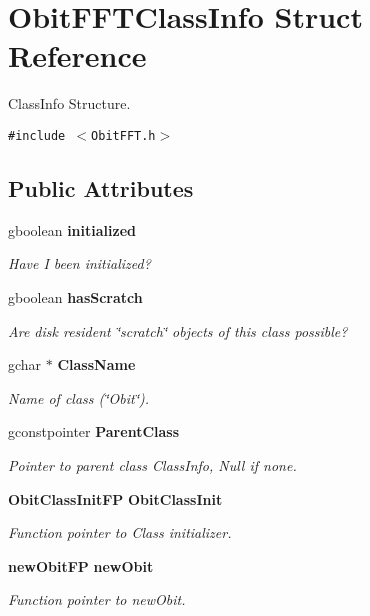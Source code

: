 \section{Obit\-FFTClass\-Info Struct Reference}
\label{structObitFFTClassInfo}
Class\-Info Structure.  


{\tt \#include $<$Obit\-FFT.h$>$}

\subsection*{Public Attributes}
\begin{CompactItemize}
\item 
gboolean {\bf initialized}
\begin{CompactList}\small\item\em Have I been initialized? \item\end{CompactList}\item 
gboolean {\bf has\-Scratch}
\begin{CompactList}\small\item\em Are disk resident \char`\"{}scratch\char`\"{} objects of this class possible? \item\end{CompactList}\item 
gchar $\ast$ {\bf Class\-Name}
\begin{CompactList}\small\item\em Name of class (\char`\"{}Obit\char`\"{}). \item\end{CompactList}\item 
gconstpointer {\bf Parent\-Class}
\begin{CompactList}\small\item\em Pointer to parent class Class\-Info, Null if none. \item\end{CompactList}\item 
{\bf Obit\-Class\-Init\-FP} {\bf Obit\-Class\-Init}
\begin{CompactList}\small\item\em Function pointer to Class initializer. \item\end{CompactList}\item 
{\bf new\-Obit\-FP} {\bf new\-Obit}
\begin{CompactList}\small\item\em Function pointer to new\-Obit. \item\end{CompactList}\item 

\end{CompactItemize}
